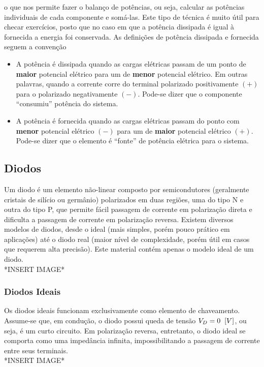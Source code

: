 \documentclass{article}
\numberwithin{equation}{section}
\begin{document}
    \noindent o que nos permite fazer o balanço de potências, ou seja, calcular as potências individuais de cada componente e somá-las. Este tipo de técnica é muito útil para checar exercícios, posto que no caso em que a potência dissipada é igual à fornecida a energia foi conservada. As definições de potência dissipada e fornecida seguem a convenção
    \begin{itemize}
        \item \hspace{0.2cm} A potência é dissipada quando as cargas elétricas passam de um ponto de \textbf{maior} potencial elétrico para um de \textbf{menor} potencial elétrico. Em outras palavras, quando a corrente corre do terminal polarizado positivamente $(+)$ para o polarizado negativamente $(-)$. Pode-se dizer que o componente ``consumiu'' potência do sistema.
        \item \hspace{0.2cm} A potência é fornecida quando as cargas elétricas passam do ponto com \textbf{menor} potencial elétrico $(-)$ para um de \textbf{maior} potencial elétrico $(+)$. Pode-se dizer que o elemento é ``fonte'' de potência elétrica para o sistema.
    \end{itemize}

    \subsection{Diodos}
    \label{subsec:diodos}
    Um diodo é um elemento não-linear composto por semicondutores (geralmente cristais de silício ou germânio) polarizados em duas regiões, uma do tipo N e outra do tipo P, que permite fácil passagem de corrente em polarização direta e dificulta a passagem de corrente em polarização reversa. Existem diversos modelos de diodos, desde o ideal (mais simples, porém pouco prático em aplicações) até o diodo real (maior nível de complexidade, porém útil em casos que requerem alta precisão). Este material contém apenas o modelo ideal de um diodo. \\
    *INSERT IMAGE*

    \subsubsection{Diodos Ideais}
    \label{subsubsec:diodos}
    Os diodos ideais funcionam exclusivamente como elemento de chaveamento. Assume-se que, em condução, o diodo possui queda de tensão $V_{D}=0 \hspace{0.2cm}[V]$, ou seja, é um curto circuito. Em polarização reversa, entretanto, o diodo ideal se comporta como uma impedância infinita, impossibilitando a passagem de corrente entre seus terminais. \\
    *INSERT IMAGE*
\end{document}
